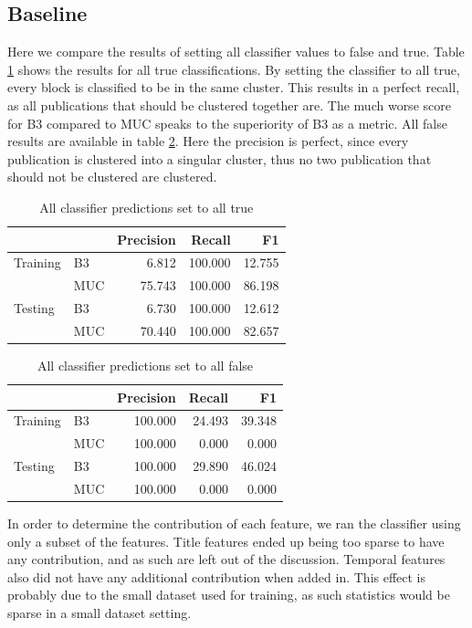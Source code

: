 \documentclass[twocolumn,letterpaper]{article}
\begin{document}
\subsection{Baseline} %
\label{sub:baseline}
Here we compare the results of setting all classifier values to false and true. Table \ref{tab:alltrue} shows the results for all true classifications. By setting the classifier to all true, every block is classified to be in the same cluster. This results in a perfect recall, as all publications that should be clustered together are. The much worse score for B3 compared to MUC speaks to the superiority of B3 as a metric. All false results are available in table \ref{tab:allfalse}. Here the precision is perfect, since every publication is clustered into a singular cluster, thus no two publication that should not be clustered are clustered.

\begin{table}[ht]
\centering
\begin{tabular}{l || l | r r r}
 & & Precision & Recall & F1 \\ \hline
Training & B3 & 6.812 & 100.000 & 12.755 \\
 & MUC & 75.743 & 100.000 & 86.198 \\ \hline
Testing & B3 & 6.730 & 100.000 & 12.612 \\
 & MUC & 70.440 & 100.000 & 82.657 \\
\end{tabular}
\caption{All classifier predictions set to all true}
\label{tab:alltrue}
\end{table}

\begin{table}[ht]
\centering
\begin{tabular}{l || l | r r r}
 & & Precision & Recall & F1 \\ \hline
Training & B3 & 100.000 & 24.493 & 39.348 \\
 & MUC & 100.000 & 0.000 & 0.000\\ \hline
Testing & B3 & 100.000 & 29.890 & 46.024 \\
 & MUC & 100.000 & 0.000 & 0.000 \\
\end{tabular}
\caption{All classifier predictions set to all false}
\label{tab:allfalse}
\end{table}

In order to determine the contribution of each feature, we ran the classifier using only a subset of the features. Title features ended up being too sparse to have any contribution, and as such are left out of the discussion. Temporal features also did not have any additional contribution when added in. This effect is probably due to the small dataset used for training, as such statistics would be sparse in a small dataset setting.
\end{document}

